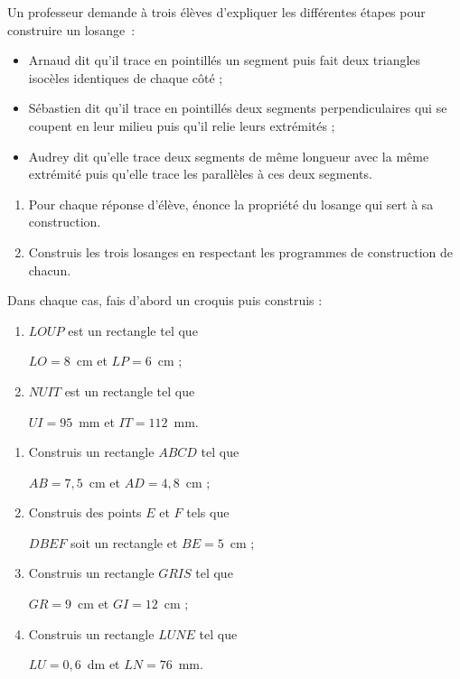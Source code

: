 \begin{exercice}
Un professeur demande à trois élèves d'expliquer les différentes étapes pour construire un losange : 
\begin{itemize}
 \item Arnaud dit qu'il trace en pointillés un segment puis fait deux triangles isocèles identiques de chaque côté ;
 \item Sébastien dit qu'il trace en pointillés deux segments perpendiculaires qui se coupent en leur milieu puis qu'il relie leurs extrémités ;
 \item Audrey dit qu'elle trace deux segments de même longueur avec la même extrémité puis qu'elle trace les parallèles à ces deux segments.
 \end{itemize}
 \begin{enumerate}
  \item Pour chaque réponse d'élève, énonce la propriété du losange qui sert à sa construction.
  \item Construis les trois losanges en respectant les programmes de construction de chacun.
 \end{enumerate}
\end{exercice}




\begin{exercice}
Dans chaque cas, fais d’abord un croquis puis construis :
\begin{enumerate}
 \item $LOUP$ est un rectangle tel que 
 
 $LO = 8$ cm et $LP = 6$ cm ;
 \item $NUIT$ est un rectangle tel que 
 
 $UI = 95$ mm et $IT = 112$ mm.
 \end{enumerate}
\end{exercice}
 
 
\begin{exercice}
\begin{enumerate}
 \item Construis un rectangle $ABCD$ tel que 
 
 $AB = 7,5$ cm et $AD = 4,8$ cm ;
 \item Construis des points $E$ et $F$ tels que 
 
 $DBEF$ soit un rectangle et $BE = 5$ cm ;
 \item Construis un rectangle $GRIS$ tel que 
 
 $GR = 9$ cm et $GI = 12$ cm ;
 \item Construis un rectangle $LUNE$ tel que 
 
 $LU = 0,6$ dm et $LN = 76$ mm.
 \end{enumerate} 
\end{exercice}


